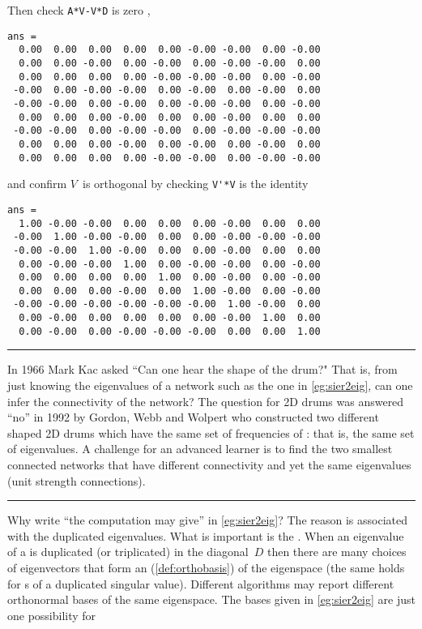 \begin{example}
\begin{solution}
\begin{itemize}
\end{itemize}
Then check \verb|A*V-V*D| is zero \twodp,
{\small%
\begin{verbatim}
ans =
  0.00  0.00  0.00  0.00  0.00 -0.00 -0.00  0.00 -0.00
  0.00  0.00 -0.00  0.00 -0.00  0.00 -0.00 -0.00  0.00
  0.00  0.00  0.00  0.00 -0.00 -0.00 -0.00  0.00 -0.00
 -0.00  0.00 -0.00 -0.00  0.00 -0.00  0.00 -0.00  0.00
 -0.00 -0.00  0.00 -0.00  0.00 -0.00 -0.00  0.00 -0.00
  0.00  0.00  0.00 -0.00  0.00  0.00 -0.00  0.00  0.00
 -0.00 -0.00  0.00 -0.00 -0.00  0.00 -0.00 -0.00 -0.00
  0.00  0.00  0.00 -0.00  0.00 -0.00  0.00 -0.00  0.00
  0.00  0.00  0.00  0.00 -0.00 -0.00  0.00 -0.00 -0.00
\end{verbatim}
}
and confirm \(V\)~is orthogonal by checking \verb|V'*V| is the identity \twodp
{\small%
\begin{verbatim}
ans =
  1.00 -0.00 -0.00  0.00  0.00  0.00 -0.00  0.00  0.00
 -0.00  1.00 -0.00 -0.00  0.00  0.00 -0.00 -0.00 -0.00
 -0.00 -0.00  1.00 -0.00  0.00  0.00 -0.00  0.00  0.00
  0.00 -0.00 -0.00  1.00  0.00 -0.00 -0.00  0.00 -0.00
  0.00  0.00  0.00  0.00  1.00  0.00 -0.00  0.00 -0.00
  0.00  0.00  0.00 -0.00  0.00  1.00 -0.00  0.00 -0.00
 -0.00 -0.00 -0.00 -0.00 -0.00 -0.00  1.00 -0.00  0.00
  0.00 -0.00  0.00  0.00  0.00  0.00 -0.00  1.00  0.00
  0.00 -0.00  0.00 -0.00 -0.00 -0.00  0.00  0.00  1.00
\end{verbatim}
}
\end{solution}
\end{example}


\begin{table}\centering\sl
\rule{\linewidth}{1pt}
\begin{minipage}{\linewidth}
In 1966 Mark Kac asked ``Can one hear the shape of the drum?"
That is, from just knowing the eigenvalues of a network such as the one in \cref{eg:sier2eig}, can one infer the connectivity of the network?
The question for 2D drums was answered ``no'' in 1992 by Gordon, Webb and Wolpert who constructed two different shaped 2D drums which have the same set of frequencies of : that is, the same set of eigenvalues.
A challenge for an advanced learner is to find the two smallest connected networks that have different connectivity and yet the same eigenvalues (unit strength connections).
\end{minipage}
\rule{\linewidth}{1pt}
\end{table}

Why write ``the computation may give'' in \cref{eg:sier2eig}?  
The reason is associated with the duplicated eigenvalues.
What is important is the .
When an eigenvalue of a  is duplicated (or triplicated) in the diagonal~\(D\) then there are many choices of eigenvectors that form an  (\cref{def:orthobasis}) of the eigenspace (the same holds for s of a duplicated singular value).
Different algorithms may report different orthonormal bases of the same eigenspace.
The bases given in \cref{eg:sier2eig} are just one possibility for 




